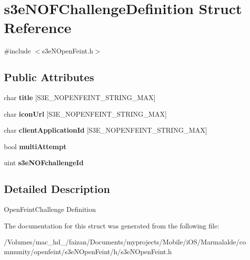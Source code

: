 \hypertarget{structs3e_n_o_f_challenge_definition}{
\section{s3eNOFChallengeDefinition Struct Reference}
\label{structs3e_n_o_f_challenge_definition}
}


{\ttfamily \#include $<$s3eNOpenFeint.h$>$}

\subsection*{Public Attributes}
\begin{DoxyCompactItemize}
\item 
\hypertarget{structs3e_n_o_f_challenge_definition_a71a7e378f359ed46f65acc9fb094c419}{
char {\bfseries title} \mbox{[}S3E\_\-NOPENFEINT\_\-STRING\_\-MAX\mbox{]}}
\label{structs3e_n_o_f_challenge_definition_a71a7e378f359ed46f65acc9fb094c419}

\item 
\hypertarget{group___n_open_feint_api_group_ga65bc3169f033538d31a6fb651d06b998}{
char {\bfseries iconUrl} \mbox{[}S3E\_\-NOPENFEINT\_\-STRING\_\-MAX\mbox{]}}
\label{group___n_open_feint_api_group_ga65bc3169f033538d31a6fb651d06b998}

\item 
\hypertarget{group___n_open_feint_api_group_gab2775b9f11c8112c1ef88f60258bada4}{
char {\bfseries clientApplicationId} \mbox{[}S3E\_\-NOPENFEINT\_\-STRING\_\-MAX\mbox{]}}
\label{group___n_open_feint_api_group_gab2775b9f11c8112c1ef88f60258bada4}

\item 
\hypertarget{group___n_open_feint_api_group_gad637b1a89c05dafbbd74e2cbf36e31d4}{
bool {\bfseries multiAttempt}}
\label{group___n_open_feint_api_group_gad637b1a89c05dafbbd74e2cbf36e31d4}

\item 
\hypertarget{group___n_open_feint_api_group_ga9dd95cd7517008538410a677ab14bd53}{
uint {\bfseries s3eNOFchallengeId}}
\label{group___n_open_feint_api_group_ga9dd95cd7517008538410a677ab14bd53}

\end{DoxyCompactItemize}


\subsection{Detailed Description}
OpenFeintChallenge Definition 

The documentation for this struct was generated from the following file:\begin{DoxyCompactItemize}
\item 
/Volumes/mac\_\-hd\_/faizan/Documents/myprojects/Mobile/iOS/Marmalalde/community/openfeint/s3eNOpenFeint/h/s3eNOpenFeint.h\end{DoxyCompactItemize}
